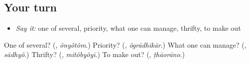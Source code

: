 \subsection*{Your turn}
\begin{itemize}
\raggedright
  \item \emph{Say it:} one of several, priority, what one can manage, thrifty, to make out
\end{itemize}

\begin{tcolorbox}[breakable,colback=teal!4,colframe=teal!35!black,title={Before you move on}]
One of several? (\textbf{}, \emph{ônyôtôm}.) Priority? (\textbf{}, \emph{ôgrādhikār}.) What one can manage? (\textbf{}, \emph{sādhyô}.) Thrifty? (\textbf{}, \emph{mitôbyôyī}.) To make out? (\textbf{}, \emph{ṭhāorāno}.)
\end{tcolorbox}
